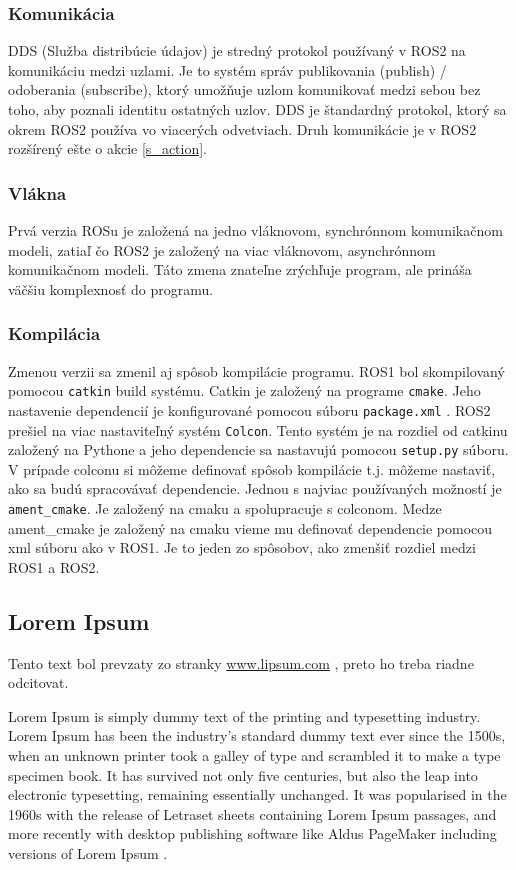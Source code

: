 \subsubsection{Komunikácia}
	DDS (Služba distribúcie údajov) je stredný protokol používaný v ROS2 na komunikáciu medzi uzlami. Je to systém správ
	publikovania (publish) / odoberania (subscribe), ktorý umožňuje uzlom komunikovať medzi sebou bez toho, aby poznali identitu ostatných uzlov. DDS je
	štandardný protokol, ktorý sa okrem ROS2 používa vo viacerých odvetviach. \cite{chatgpt} Druh komunikácie je v ROS2 rozšírený ešte o akcie \ref{s_action}.

\subsubsection{Vlákna}
	Prvá verzia ROSu je založená na jedno vláknovom, synchrónnom komunikačnom modeli, zatiaľ čo ROS2 je založený na viac vláknovom, asynchrónnom
	komunikačnom modeli. Táto zmena znateľne zrýchľuje program, ale prináša väčšiu komplexnosť do programu.

\subsubsection{Kompilácia}
	Zmenou verzii sa zmenil aj spôsob kompilácie programu. ROS1 bol skompilovaný pomocou \texttt{catkin} build systému. Catkin je založený na programe
	\texttt{cmake}. Jeho nastavenie dependencií je konfigurované pomocou súboru \texttt{package.xml} . ROS2 prešiel na viac nastaviteľný systém \texttt{Colcon}.
	Tento systém je na rozdiel od catkinu založený na Pythone a jeho dependencie sa nastavujú pomocou \texttt{setup.py} súboru. V prípade colconu si môžeme definovať
	spôsob kompilácie t.j. môžeme nastaviť, ako sa budú spracovávať dependencie. Jednou s najviac používaných možností je \texttt{ament\_cmake}. Je založený
	na cmaku a spolupracuje s colconom. Medze ament\_cmake je založený na cmaku vieme mu definovať dependencie pomocou xml súboru ako v ROS1. Je to jeden zo spôsobov,
	ako zmenšiť rozdiel medzi ROS1 a ROS2.

\subsection{Lorem Ipsum}
Tento text bol prevzaty zo stranky \url{www.lipsum.com} \cite{lipsum}, preto ho treba riadne odcitovat.

Lorem Ipsum is simply dummy text of the printing and typesetting industry. Lorem Ipsum has been the industry's standard dummy text ever since the 1500s, when an unknown printer took a galley of type and scrambled it to make a type specimen book. It has survived not only five centuries, but also the leap into electronic typesetting, remaining essentially unchanged. It was popularised in the 1960s with the release of Letraset sheets containing Lorem Ipsum passages, and more recently with desktop publishing software like Aldus PageMaker including versions of Lorem Ipsum \cite{lipsum}.

